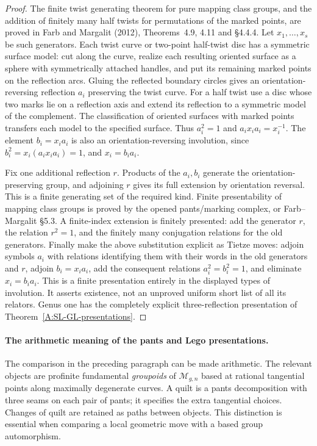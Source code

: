 \begin{proof}
The finite twist generating theorem for pure mapping class groups,
and the addition of finitely many half twists for permutations of
the marked points, are proved in Farb and Margalit (2012),
Theorems~4.9, 4.11 and \S4.4.4. Let $x_1,\ldots,x_s$ be such
generators. Each twist curve or two-point half-twist disc has a
symmetric surface model: cut along the curve, realize each
resulting oriented surface as a sphere with symmetrically attached
handles, and put its remaining marked points on the reflection
arcs. Gluing the reflected boundary circles gives an
orientation-reversing reflection $a_i$ preserving the twist curve.
For a half twist use a disc whose two marks lie on a reflection
axis and extend its reflection to a symmetric model of the
complement. The classification of oriented surfaces with marked
points transfers each model to the specified surface. Thus
$a_i^2=1$ and $a_ix_ia_i=x_i^{-1}$. The element
$b_i=x_i a_i$ is also an orientation-reversing involution, since
$b_i^2=x_i(a_ix_ia_i)=1$, and $x_i=b_i a_i$.

Fix one additional reflection $r$. Products of the $a_i,b_i$
generate the orientation-preserving group, and adjoining $r$
gives its full extension by orientation reversal. This is a finite
generating set of the required kind. Finite presentability of
mapping class groups is proved by the opened pants/marking
complex, or Farb--Margalit \S5.3. A finite-index extension is
finitely presented: add the generator $r$, the relation $r^2=1$,
and the finitely many conjugation relations for the old generators.
Finally make the above substitution explicit as Tietze moves:
adjoin symbols $a_i$ with relations identifying them with their
words in the old generators and $r$, adjoin $b_i=x_i a_i$, add
the consequent relations $a_i^2=b_i^2=1$, and eliminate
$x_i=b_i a_i$. This is a finite presentation entirely in the
displayed types of involution. It asserts existence, not an
unproved uniform short list of all its relators. Genus one has
the completely explicit three-reflection presentation of
Theorem~\ref{A:SL-GL-presentations}.
\end{proof}

\paragraph{The arithmetic meaning of the pants and Lego presentations.}
The comparison in the preceding paragraph can be made arithmetic.
The relevant objects are profinite fundamental \emph{groupoids} of
$\mathcal M_{g,n}$ based at rational tangential points along maximally
degenerate curves. A quilt is a pants decomposition with three seams on
each pair of pants; it specifies the extra tangential choices. Changes
of quilt are retained as paths between objects. This distinction is
essential when comparing a local geometric move with a based group
automorphism.

